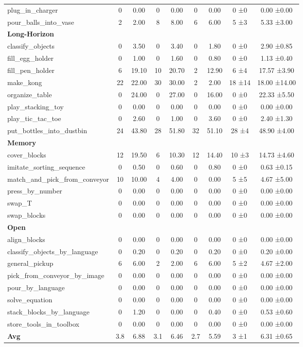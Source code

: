 \begin{table}[H]
{\begin{tabular}{l|c|c|c|c|c|c|c|c}
plug\_in\_charger & 0 & 0.00 & 0 & 0.00 & 0 & 0.00 & 0 ±0 & 0.00 ±0.00 \\
pour\_balls\_into\_vase & 2 & 2.00 & 8 & 8.00 & 6 & 6.00 & 5 ±3 & 5.33 ±3.00 \\
\hline
\multicolumn{9}{l}{\textbf{Long-Horizon}} \\
classify\_objects & 0 & 3.50 & 0 & 3.40 & 0 & 1.80 & 0 ±0 & 2.90 ±0.85 \\
fill\_egg\_holder & 0 & 1.00 & 0 & 1.60 & 0 & 0.80 & 0 ±0 & 1.13 ±0.40 \\
fill\_pen\_holder & 6 & 19.10 & 10 & 20.70 & 2 & 12.90 & 6 ±4 & 17.57 ±3.90 \\
make\_kong & 22 & 22.00 & 30 & 30.00 & 2 & 2.00 & 18 ±14 & 18.00 ±14.00 \\
organize\_table & 0 & 24.00 & 0 & 27.00 & 0 & 16.00 & 0 ±0 & 22.33 ±5.50 \\
play\_stacking\_toy & 0 & 0.00 & 0 & 0.00 & 0 & 0.00 & 0 ±0 & 0.00 ±0.00 \\
play\_tic\_tac\_toe & 0 & 2.60 & 0 & 1.00 & 0 & 3.60 & 0 ±0 & 2.40 ±1.30 \\
put\_bottles\_into\_dustbin & 24 & 43.80 & 28 & 51.80 & 32 & 51.10 & 28 ±4 & 48.90 ±4.00 \\
\hline
\multicolumn{9}{l}{\textbf{Memory}} \\
cover\_blocks & 12 & 19.50 & 6 & 10.30 & 12 & 14.40 & 10 ±3 & 14.73 ±4.60 \\
imitate\_sorting\_sequence & 0 & 0.50 & 0 & 0.60 & 0 & 0.80 & 0 ±0 & 0.63 ±0.15 \\
match\_and\_pick\_from\_conveyor & 10 & 10.00 & 4 & 4.00 & 0 & 0.00 & 5 ±5 & 4.67 ±5.00 \\
press\_by\_number & 0 & 0.00 & 0 & 0.00 & 0 & 0.00 & 0 ±0 & 0.00 ±0.00 \\
swap\_T & 0 & 0.00 & 0 & 0.00 & 0 & 0.00 & 0 ±0 & 0.00 ±0.00 \\
swap\_blocks & 0 & 0.00 & 0 & 0.00 & 0 & 0.00 & 0 ±0 & 0.00 ±0.00 \\
\hline
\multicolumn{9}{l}{\textbf{Open}} \\
align\_blocks & 0 & 0.00 & 0 & 0.00 & 0 & 0.00 & 0 ±0 & 0.00 ±0.00 \\
classify\_objects\_by\_language & 0 & 0.20 & 0 & 0.20 & 0 & 0.20 & 0 ±0 & 0.20 ±0.00 \\
general\_pickup & 6 & 6.00 & 2 & 2.00 & 6 & 6.00 & 5 ±2 & 4.67 ±2.00 \\
pick\_from\_conveyor\_by\_image & 0 & 0.00 & 0 & 0.00 & 0 & 0.00 & 0 ±0 & 0.00 ±0.00 \\
pour\_by\_language & 0 & 0.00 & 0 & 0.00 & 0 & 0.00 & 0 ±0 & 0.00 ±0.00 \\
solve\_equation & 0 & 0.00 & 0 & 0.00 & 0 & 0.00 & 0 ±0 & 0.00 ±0.00 \\
stack\_blocks\_by\_language & 0 & 1.20 & 0 & 0.00 & 0 & 0.40 & 0 ±0 & 0.53 ±0.60 \\
store\_tools\_in\_toolbox & 0 & 0.00 & 0 & 0.00 & 0 & 0.00 & 0 ±0 & 0.00 ±0.00 \\
\hline
\textbf{Avg} & 3.8 & 6.88 & 3.1 & 6.46 & 2.7 & 5.59 & 3 ±1 & 6.31 ±0.65 \\
\hline
\end{tabular}
}
\end{table}